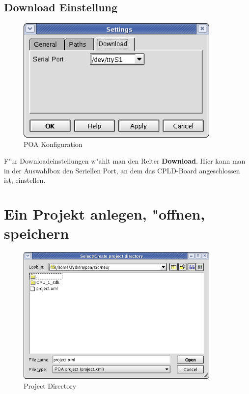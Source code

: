 \documentclass[a4paper,titlepage,12pt,ngerman]{scrbook}
\begin{document}
\subsection{Download Einstellung}
\begin{figure}[htbp]

\begin{center}

\includegraphics[width=10cm]{POAConfiguration3}

\caption{POA Konfiguration}\label{test}

\end{center}

\end{figure}
F"ur Downloadeinstellungen w"ahlt man den Reiter {\bf Download}. Hier kann man in der Auswahlbox den Seriellen Port, an dem das CPLD-Board angeschlossen ist, einstellen.\par


\newpage
\section{Ein Projekt anlegen, "offnen, speichern}
\begin{figure}[htbp]

\begin{center}

\includegraphics[width=10cm]{Directory}

\caption{Project Directory}\label{test}

\end{center}

\end{figure}
\end{document}
